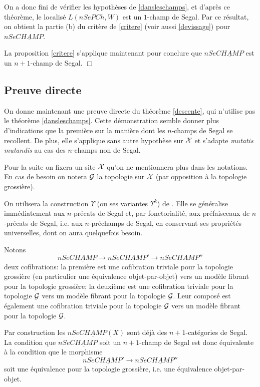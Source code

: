 \documentclass[12pt]{article}
\newcommand{\subnumero}[1]{\subsection*{#1}\phantomsection\addcontentsline{toc}{subsection}{#1}}
\newcommand{\eop}{\hfill $\Box$\vspace{.1in}}
\newcommand{\Gg}{{\cal G}}
\newcommand{\Xx}{{\cal X}}
\begin{document}
On a donc fini de v\'erifier les hypoth\`eses de \ref{dansleschamps},
et d'apr\`es ce th\'eor\`eme, le localis\'e $L(nSePCh, W)$
est un $1$-champ de Segal. 
Par ce r\'esultat, on obtient la partie (b) du crit\`ere de \ref{critere} 
(voir aussi \ref{devissage}) pour
$nSe\underline{CHAMP}$. 

La proposition \ref{critere}  
s'applique maintenant pour conclure que
$nSe\underline{CHAMP}$ est
un $n+1$-champ de Segal.
\eop


\subnumero{Preuve directe}
On donne maintenant une preuve directe du th\'eor\`eme \ref{descente},
qui n'utilise pas
le th\'eor\`eme \ref{dansleschamps}. Cette d\'emonstration semble
donner plus d'indications que la premi\`ere sur la mani\`ere dont les
$n$-champs de Segal se recollent. De plus, elle s'applique
sans autre hypoth\`ese sur
$\Xx$ et s'adapte {\em mutatis mutandis} au cas des $n$-champs non de
Segal.

Pour la suite on fixera
un site $\Xx$ qu'on ne mentionnera
plus dans les notations. En cas de besoin on notera
$\Gg$ la
topologie sur $\Xx$ (par opposition \`a la topologie grossi\`ere).

On utilisera la construction $\Upsilon$ (ou ses variantes $\Upsilon ^k$) de
\cite{limits}. Elle se g\'en\'eralise im\-m\'e\-dia\-te\-ment
aux $n$-pr\'ecats de
Segal et, par fonctorialit\'e, aux pr\'efaisceaux de
$n$-pr\'ecats de Segal, i.e. aux $n$-pr\'echamps de Segal, en conservant ses
propri\'et\'es universelles, dont on aura quelquefois besoin.


Notons
$$
nSe\underline{CHAMP}\rightarrow nSe\underline{CHAMP}'
\rightarrow nSe\underline{CHAMP}''
$$
deux cofibrations: la premi\`ere est une cofibration triviale pour la topologie
grossi\`ere (en particulier une \'equivalence objet-par-objet) vers un
mod\`ele
fibrant pour la topologie grossi\`ere;  la deuxi\`eme est une cofibration
triviale
pour la topologie $\Gg$ vers un mod\`ele fibrant pour la topologie $\Gg$. Leur
compos\'e est \'egalement une cofibration triviale pour la topologie
$\Gg$ vers
un mod\`ele fibrant pour la topologie $\Gg$.

Par construction les $nSe\underline{CHAMP}(X)$ sont d\'ej\`a des
$n+1$-cat\'egories de Segal. La condition que $nSe\underline{CHAMP}$ soit
un $n+1$-champ de Segal est donc \'equivalente \`a la condition que le morphisme
$$
nSe\underline{CHAMP}'\rightarrow nSe\underline{CHAMP}''
$$
soit une \'equivalence pour la topologie grossi\`ere, i.e. une \'equivalence
objet-par-objet.
\end{document}
